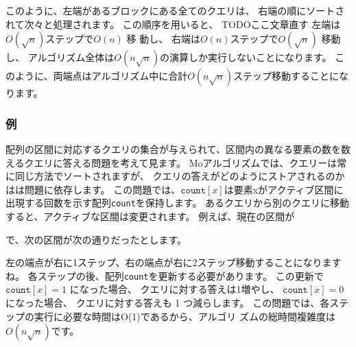 このように、左端があるブロックにある全てのクエリは、
右端の順にソートされて次々と処理されます。
この順序を用いると、
TODOここ文章直す
左端は$O(\sqrt n)$ステップで$O(n)$ 移 動し、
右端は$O(n)$ステップで$O(\sqrt n)$ 移動し、
アルゴリズム全体は$O(n \sqrt n)$の演算しか実行しないことになります。
このように、両端点はアルゴリズム中に合計$O(n \sqrt n)$ステップ移動することになります。

\subsubsection*{例}

配列の区間に対応するクエリの集合が与えられて、区間内の異なる要素の数を数えるクエリに答える問題を考えて見ます。
Moアルゴリズムでは、クエリーは常に同じ方法でソートされますが、
クエリの答えがどのようにストアされるのかはは問題に依存します。
この問題では、$\texttt{count}[x]$は要素xがアクティブ区間に出現する回数を示す配列\texttt{count}を保持します。
あるクエリから別のクエリに移動すると、アクティブな区間は変更されます。
例えば、現在の区間が

\begin{center}
\end{center}
で、次の区間が次の通りだったとします。
\begin{center}
\end{center}
左の端点が右に1ステップ、右の端点が右に2ステップ移動することになりますね。
各ステップの後、配列\texttt{count}を更新する必要があります。
この更新で$\texttt{count}[x]=1$ になった場合、 クエリに対する答えは1増やし、
$\texttt{count}[x]=0$ になった場合、 クエリに対する答えも 1 つ減らします。
この問題では、各ステップの実行に必要な時間はO(1)であるから、アルゴリ ズムの総時間複雑度は$O(n \sqrt n)$です。
